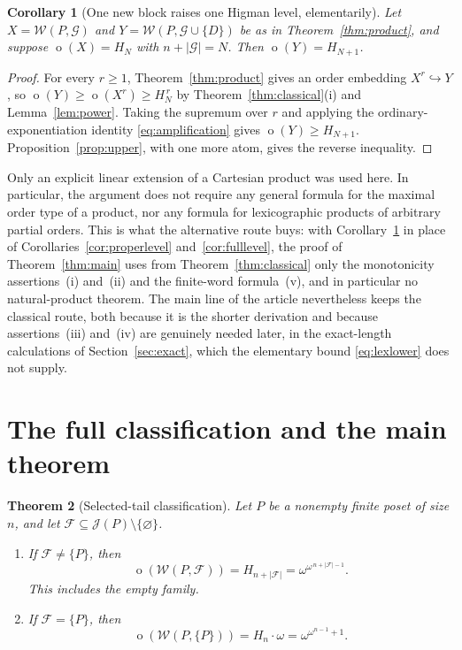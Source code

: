 \documentclass[11pt,a4paper]{article}
\numberwithin{equation}{section}
\newtheorem{theorem}{Theorem}[section]
\newtheorem{corollary}[theorem]{Corollary}
\theoremstyle{definition}
\theoremstyle{remark}
\newcommand{\mot}{\mathop{o}}
\newcommand{\W}{\mathcal W}
\newcommand{\J}{\mathcal J}
\newcommand{\F}{\mathcal F}
\newcommand{\G}{\mathcal G}
\newcommand{\Hn}[1]{H_{#1}}
\begin{document}
\begin{corollary}[One new block raises one Higman level, elementarily]
\label{cor:altlevel}
Let $X=\W(P,\G)$ and $Y=\W(P,\G\cup\{D\})$ be as in
Theorem~\ref{thm:product}, and suppose $\mot(X)=\Hn N$ with $n+|\G|=N$. Then
$\mot(Y)=\Hn{N+1}$.
\end{corollary}
\begin{proof}
For every $r\ge1$, Theorem~\ref{thm:product} gives an order embedding
$X^{r}\hookrightarrow Y$, so $\mot(Y)\ge\mot(X^{r})\ge\Hn N^{\,r}$ by
Theorem~\ref{thm:classical}(i) and Lemma~\ref{lem:power}. Taking the supremum
over $r$ and applying the ordinary-exponentiation identity
\eqref{eq:amplification} gives $\mot(Y)\ge\Hn{N+1}$.
Proposition~\ref{prop:upper}, with one more atom, gives the reverse
inequality.
\end{proof}

Only an explicit linear extension of a Cartesian product was used here. In
particular, the argument does not require any general formula for the maximal
order type of a product, nor any formula for lexicographic products of
arbitrary partial orders. This is what the alternative route buys: with
Corollary~\ref{cor:altlevel} in place of
Corollaries~\ref{cor:properlevel} and~\ref{cor:fulllevel}, the proof of
Theorem~\ref{thm:main} uses from Theorem~\ref{thm:classical} only the
monotonicity assertions~(i) and~(ii) and the finite-word formula~(v), and in
particular no natural-product theorem. The main line of the article
nevertheless keeps the classical route, both because it is the shorter
derivation and because assertions~(iii) and~(iv) are genuinely needed later, in
the exact-length calculations of Section~\ref{sec:exact}, which the
elementary bound \eqref{eq:lexlower} does not supply.

\section{The full classification and the main theorem}
\label{sec:classification}

\begin{theorem}[Selected-tail classification]\label{thm:family}
Let $P$ be a nonempty finite poset of size $n$, and let
$\F\subseteq\J(P)\setminus\{\varnothing\}$.
\begin{enumerate}[label=\textnormal{(\roman*)}]
\item If $\F\ne\{P\}$, then
\begin{equation}\label{eq:family}
 \mot(\W(P,\F))=H_{n+|\F|}
 =\omega^{\omega^{\,n+|\F|-1}}.
\end{equation}
This includes the empty family.
\item If $\F=\{P\}$, then
\begin{equation}\label{eq:exception}
 \mot(\W(P,\{P\}))=H_n\cdot\omega
    =\omega^{\omega^{n-1}+1}.
\end{equation}
\end{enumerate}
\end{theorem}
\end{document}
